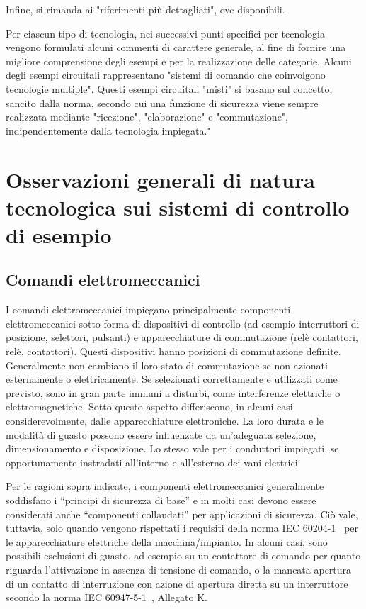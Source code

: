 Infine, si rimanda ai "riferimenti più dettagliati", ove disponibili.

Per ciascun tipo di tecnologia, nei successivi punti specifici per tecnologia vengono formulati alcuni commenti di carattere generale, al fine di fornire una migliore comprensione degli esempi e per la realizzazione delle categorie.
Alcuni degli esempi circuitali rappresentano "sistemi di comando che coinvolgono tecnologie multiple". Questi esempi circuitali "misti" si basano sul concetto, sancito dalla norma, secondo cui una funzione di sicurezza viene sempre realizzata mediante "ricezione", "elaborazione" e "commutazione", indipendentemente dalla tecnologia impiegata."

\section{Osservazioni generali di natura tecnologica sui sistemi di controllo di esempio}
\label{sec:08-1}

\subsection{Comandi elettromeccanici}
\label{subsec:08-1-1}
I comandi elettromeccanici impiegano principalmente componenti elettromeccanici sotto forma di dispositivi di controllo (ad esempio interruttori di posizione, selettori, pulsanti) e apparecchiature di commutazione (relè contattori, relè, contattori). Questi dispositivi hanno posizioni di commutazione definite. Generalmente non cambiano il loro stato di commutazione se non azionati esternamente o elettricamente. Se selezionati correttamente e utilizzati come previsto, sono in gran parte immuni a disturbi, come interferenze elettriche o elettromagnetiche. Sotto questo aspetto differiscono, in alcuni casi considerevolmente, dalle apparecchiature elettroniche. La loro durata e le modalità di guasto possono essere influenzate da un'adeguata selezione, dimensionamento e disposizione. Lo stesso vale per i conduttori impiegati, se opportunamente instradati all'interno e all'esterno dei vani elettrici.

Per le ragioni sopra indicate, i componenti elettromeccanici generalmente soddisfano i “principi di sicurezza di base” e in molti casi devono essere considerati anche “componenti collaudati” per applicazioni di sicurezza. Ciò vale, tuttavia, solo quando vengono rispettati i requisiti della norma IEC 60204-1~\cite{iec60204-1} per le apparecchiature elettriche della macchina/impianto. In alcuni casi, sono possibili esclusioni di guasto, ad esempio su un contattore di comando per quanto riguarda l'attivazione in assenza di tensione di comando, o la mancata apertura di un contatto di interruzione con azione di apertura diretta su un interruttore secondo la norma IEC 60947-5-1~\cite{iec60947-5-1}, Allegato K.

